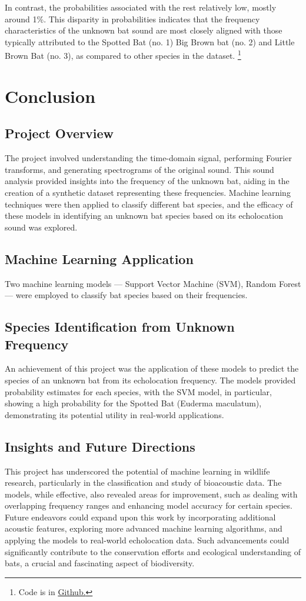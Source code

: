 \documentclass[12pt]{article}
\begin{document}
In contrast, the probabilities associated with the rest relatively low, mostly around 1\%. This disparity in probabilities indicates that the frequency characteristics of the unknown bat sound are most closely aligned with those typically attributed to the Spotted Bat (no. 1) Big Brown bat (no. 2) and Little Brown Bat (no. 3), as compared to other species in the dataset. \footnote{Code is in \href{https://github.com/hoang-nguyen13/Bat_Sound.git}{Github.}}


\section{Conclusion}

\subsection{Project Overview}
The project involved understanding the time-domain signal, performing Fourier transforms, and generating spectrograms of the original sound. This sound analysis provided insights into the frequency of the unknown bat, aiding in the creation of a synthetic dataset representing these frequencies. Machine learning techniques were then applied to classify different bat species, and the efficacy of these models in identifying an unknown bat species based on its echolocation sound was explored.
\subsection{Machine Learning Application}
Two machine learning models — Support Vector Machine (SVM), Random Forest — were employed to classify bat species based on their frequencies.
\subsection{Species Identification from Unknown Frequency}
An achievement of this project was the application of these models to predict the species of an unknown bat from its echolocation frequency. The models provided probability estimates for each species, with the SVM model, in particular, showing a high probability for the Spotted Bat (Euderma maculatum), demonstrating its potential utility in real-world applications.

\subsection{Insights and Future Directions}
This project has underscored the potential of machine learning in wildlife research, particularly in the classification and study of bioacoustic data. The models, while effective, also revealed areas for improvement, such as dealing with overlapping frequency ranges and enhancing model accuracy for certain species.
Future endeavors could expand upon this work by incorporating additional acoustic features, exploring more advanced machine learning algorithms, and applying the models to real-world echolocation data. Such advancements could significantly contribute to the conservation efforts and ecological understanding of bats, a crucial and fascinating aspect of biodiversity.
\end{document}
